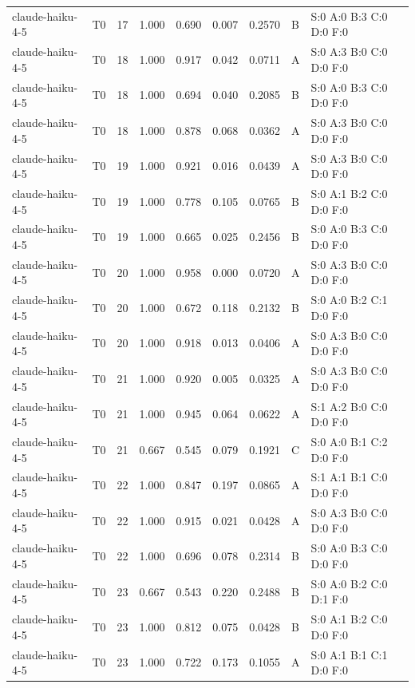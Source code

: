 \begin{longtable}{llrrrrrll}
claude-haiku-4-5 & T0 & 17 & 1.000 & 0.690 & 0.007 & 0.2570 & B & \tiny S:0 A:0 B:3 C:0 D:0 F:0 \\
claude-haiku-4-5 & T0 & 18 & 1.000 & 0.917 & 0.042 & 0.0711 & A & \tiny S:0 A:3 B:0 C:0 D:0 F:0 \\
claude-haiku-4-5 & T0 & 18 & 1.000 & 0.694 & 0.040 & 0.2085 & B & \tiny S:0 A:0 B:3 C:0 D:0 F:0 \\
claude-haiku-4-5 & T0 & 18 & 1.000 & 0.878 & 0.068 & 0.0362 & A & \tiny S:0 A:3 B:0 C:0 D:0 F:0 \\
claude-haiku-4-5 & T0 & 19 & 1.000 & 0.921 & 0.016 & 0.0439 & A & \tiny S:0 A:3 B:0 C:0 D:0 F:0 \\
claude-haiku-4-5 & T0 & 19 & 1.000 & 0.778 & 0.105 & 0.0765 & B & \tiny S:0 A:1 B:2 C:0 D:0 F:0 \\
claude-haiku-4-5 & T0 & 19 & 1.000 & 0.665 & 0.025 & 0.2456 & B & \tiny S:0 A:0 B:3 C:0 D:0 F:0 \\
claude-haiku-4-5 & T0 & 20 & 1.000 & 0.958 & 0.000 & 0.0720 & A & \tiny S:0 A:3 B:0 C:0 D:0 F:0 \\
claude-haiku-4-5 & T0 & 20 & 1.000 & 0.672 & 0.118 & 0.2132 & B & \tiny S:0 A:0 B:2 C:1 D:0 F:0 \\
claude-haiku-4-5 & T0 & 20 & 1.000 & 0.918 & 0.013 & 0.0406 & A & \tiny S:0 A:3 B:0 C:0 D:0 F:0 \\
claude-haiku-4-5 & T0 & 21 & 1.000 & 0.920 & 0.005 & 0.0325 & A & \tiny S:0 A:3 B:0 C:0 D:0 F:0 \\
claude-haiku-4-5 & T0 & 21 & 1.000 & 0.945 & 0.064 & 0.0622 & A & \tiny S:1 A:2 B:0 C:0 D:0 F:0 \\
claude-haiku-4-5 & T0 & 21 & 0.667 & 0.545 & 0.079 & 0.1921 & C & \tiny S:0 A:0 B:1 C:2 D:0 F:0 \\
claude-haiku-4-5 & T0 & 22 & 1.000 & 0.847 & 0.197 & 0.0865 & A & \tiny S:1 A:1 B:1 C:0 D:0 F:0 \\
claude-haiku-4-5 & T0 & 22 & 1.000 & 0.915 & 0.021 & 0.0428 & A & \tiny S:0 A:3 B:0 C:0 D:0 F:0 \\
claude-haiku-4-5 & T0 & 22 & 1.000 & 0.696 & 0.078 & 0.2314 & B & \tiny S:0 A:0 B:3 C:0 D:0 F:0 \\
claude-haiku-4-5 & T0 & 23 & 0.667 & 0.543 & 0.220 & 0.2488 & B & \tiny S:0 A:0 B:2 C:0 D:1 F:0 \\
claude-haiku-4-5 & T0 & 23 & 1.000 & 0.812 & 0.075 & 0.0428 & B & \tiny S:0 A:1 B:2 C:0 D:0 F:0 \\
claude-haiku-4-5 & T0 & 23 & 1.000 & 0.722 & 0.173 & 0.1055 & A & \tiny S:0 A:1 B:1 C:1 D:0 F:0 \\

\end{longtable}
